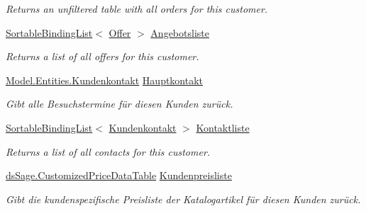 \begin{DoxyCompactItemize}
\begin{DoxyCompactList}\small\item\em Returns an unfiltered table with all orders for this customer. \end{DoxyCompactList}\item 
\hyperlink{class_products_1_1_common_1_1_sortable_binding_list}{Sortable\+Binding\+List}$<$ \hyperlink{class_products_1_1_model_1_1_entities_1_1_offer}{Offer} $>$ \hyperlink{class_products_1_1_model_1_1_entities_1_1_kunde_a73f1b78662a30f7739a679a4794834d3}{Angebotsliste}
\begin{DoxyCompactList}\small\item\em Returns a list of all offers for this customer. \end{DoxyCompactList}\item 
\hyperlink{class_products_1_1_model_1_1_entities_1_1_kundenkontakt}{Model.\+Entities.\+Kundenkontakt} \hyperlink{class_products_1_1_model_1_1_entities_1_1_kunde_a0a816839608eab259646739d351aa3e6}{Hauptkontakt}
\begin{DoxyCompactList}\small\item\em Gibt alle Besuchstermine für diesen Kunden zurück. \end{DoxyCompactList}\item 
\hyperlink{class_products_1_1_common_1_1_sortable_binding_list}{Sortable\+Binding\+List}$<$ \hyperlink{class_products_1_1_model_1_1_entities_1_1_kundenkontakt}{Kundenkontakt} $>$ \hyperlink{class_products_1_1_model_1_1_entities_1_1_kunde_a9e740954815dccf75d837b573da2801e}{Kontaktliste}
\begin{DoxyCompactList}\small\item\em Returns a list of all contacts for this customer. \end{DoxyCompactList}\item 
\hyperlink{class_products_1_1_data_1_1ds_sage_1_1_customized_price_data_table}{ds\+Sage.\+Customized\+Price\+Data\+Table} \hyperlink{class_products_1_1_model_1_1_entities_1_1_kunde_ae5f4345337a7cb2a53d7c17716eafc1a}{Kundenpreisliste}
\begin{DoxyCompactList}\small\item\em Gibt die kundenspezifische Preisliste der Katalogartikel für diesen Kunden zurück. \end{DoxyCompactList}\item 

\end{DoxyCompactItemize}
